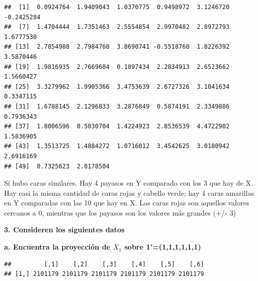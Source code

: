 \documentclass[
]{article}
\newenvironment{Shaded}{\begin{snugshade}}{\end{snugshade}}
\newcommand{\CommentTok}[1]{\textcolor[rgb]{0.56,0.35,0.01}{\textit{#1}}}
\newcommand{\DecValTok}[1]{\textcolor[rgb]{0.00,0.00,0.81}{#1}}
\newcommand{\KeywordTok}[1]{\textcolor[rgb]{0.13,0.29,0.53}{\textbf{#1}}}
\newcommand{\NormalTok}[1]{#1}
\newcommand{\OperatorTok}[1]{\textcolor[rgb]{0.81,0.36,0.00}{\textbf{#1}}}
\newcommand{\StringTok}[1]{\textcolor[rgb]{0.31,0.60,0.02}{#1}}
\begin{document}
\begin{verbatim}
##  [1]  0.0924764  1.9409043  1.0370775  0.9498972  3.1246720 -0.2425284
##  [7]  1.4704444  1.7351463  2.5554854  2.9970482  2.8972793  1.6777530
## [13]  2.7854980  2.7984760  3.8690741 -0.5518760  1.8226392  3.5870446
## [19]  1.9816935  2.7669604  0.1897434  2.2834913  2.6523662  1.5660427
## [25]  3.3279962  1.9905366  3.4753639  2.6727326  3.1041634  0.3347115
## [31]  1.6788145  2.1296833  3.2876849  0.5874191  2.3349886  0.7936343
## [37]  1.8006596  0.5030704  1.4224923  2.8536539  4.4722902  1.5836905
## [43]  1.3513725  1.4884272  1.0716012  3.4542625  3.0180942  2.6916169
## [49]  0.7325623  2.0178504
\end{verbatim}

Sí hubo caras similares. Hay 4 payasos en Y comparado con los 3 que hay
de X. Hay casi la misma cantidad de caras rojas y cabello verde; hay 4
caras amarillas en Y comparadas con las 10 que hay en X. Las caras rojas
son aquellos valores cercanos a 0, mientras que los payasos son los
valores más grandes (+/- 3)

\textbf{3. Consideren los siguientes datos}

\textbf{a. Encuentra la proyección de \(X_1\) sobre 1'=(1,1,1,1,1,1)}

\begin{Shaded}
\end{Shaded}

\begin{verbatim}
##         [,1]    [,2]    [,3]    [,4]    [,5]    [,6]
## [1,] 2101179 2101179 2101179 2101179 2101179 2101179
\end{verbatim}
\end{document}
